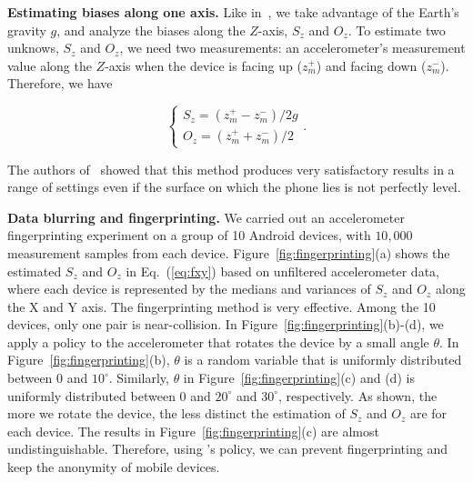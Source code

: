 \textbf{Estimating biases along one axis.}
Like in~\cite{bojinov2014mobile}, we take advantage of the Earth's gravity
$g$, and analyze the biases along the $Z$-axis, $S_z$ and $O_z$. To 
estimate two unknows, $S_z$ and $O_z$, we need two measurements: an
accelerometer's measurement value along the $Z$-axis when the device is 
facing up ($z_m^+$) and facing down ($z_m^-$). Therefore, we have

\begin{equation}\label{eq:fxy}
\left\{
    \begin{array}{c}
      S_z = (z_m^+ - z_m^-)/2g \\
      O_z = (z_m^+ + z_m^-)/2
    \end{array}
  \right..
\end{equation}

The authors of~\cite{bojinov2014mobile} showed that this method 
produces very satisfactory results in a range of settings even 
if the surface on which the phone lies is not perfectly level.

\textbf{Data blurring and fingerprinting.}
We carried out an accelerometer fingerprinting experiment on a group
of 10 Android devices, with $10,000$ measurement samples from each device.
Figure~\ref{fig:fingerprinting}(a) shows the estimated $S_z$ and $O_z$ in Eq.~(\ref{eq:fxy})
based on unfiltered accelerometer data, where each device is represented 
by the medians and variances of $S_z$ and $O_z$ along the X and Y axis. 
The fingerprinting method is
very effective. Among the 10 devices, only one pair is near-collision. In
Figure~\ref{fig:fingerprinting}(b)-(d), we apply a policy to the 
accelerometer that rotates the device by a small angle $\theta$. In 
Figure~\ref{fig:fingerprinting}(b), $\theta$ is a random variable that is
uniformly distributed between $0$ and $10^{\circ}$. Similarly, $\theta$
in Figure~\ref{fig:fingerprinting}(c) and (d) is uniformly distributed 
between $0$ and $20^{\circ}$ and $30^{\circ}$, respectively. As shown, the more we rotate the 
device, the less distinct the estimation of $S_z$ and $O_z$ are for each 
device. The results in Figure~\ref{fig:fingerprinting}(c) are almost 
undistinguishable. Therefore, using \sysname's policy, we can 
prevent fingerprinting and keep the anonymity of mobile devices.

%
%

